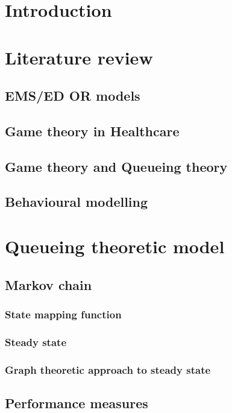\documentclass{article}
\begin{document}
    \maketitle
    \tableofcontents
    \newpage

    \section{Introduction}
    \section{Literature review}
        \subsection{EMS/ED OR models}
        \subsection{Game theory in Healthcare}
        \subsection{Game theory and Queueing theory}
        \subsection{Behavioural modelling}
    \section{Queueing theoretic model}
        \subsection{Markov chain}
            \subsubsection{State mapping function}
            \subsubsection{Steady state}
            \subsubsection{Graph theoretic approach to steady state}
        \subsection{Performance measures}
\end{document}
